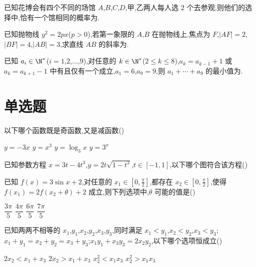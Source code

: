 \begin{problem}
已知花博会有四个不同的场馆 \(A\),\(B\),\(C\),\(D\),甲,乙两人每人选 \(2\) 个去参观,则他们的选择中,恰有一个馆相同的概率为\fillinblank{}.
\end{problem}

\begin{problem}
已知抛物线 \(y^2=2px\)(\(p>0\)),若第一象限的 \(A\),\(B\) 在抛物线上,焦点为 \(F\),\(|AF|=2\),\(|BF|=4\),\(|AB|=3\),求直线 \(AB\) 的斜率为\fillinblank{}.
\end{problem}

\begin{problem}
已知 \(a_i\in \N^*\)(\(i=1\),\(2\),\(\dots\),\(9\)),对任意的 \(k\in \N^*\)(\(2\le k\le 8\)),\(a_k=a_{k-1}+1\) 或 \(a_k=a_{k+1}-1\) 中有且仅有一个成立,\(a_1=6\),\(a_9=9\),则 \(a_1+\cdots+a_9\) 的最小值为\fillinblank{}.
\end{problem}

\section{单选题}

\begin{problem}
以下哪个函数既是奇函数,又是减函数(\quad)

\choices
    {\(y=-3x\)}
    {\(y=x^3\)}
    {\(y=\log_3 x\)}
    {\(y=3^x\)}
\end{problem}

\begin{problem}
已知参数方程 \(x=3t-4t^3\),\(y=2t\sqrt{1-t^2}\),\(t\in[-1,1]\),以下哪个图符合该方程(\quad)

\choices
    {}
    {}
    {}
    {}
\end{problem}

\begin{problem}
已知 \(f(x)=3\sin x+2\),对任意的 \(x_1\in\left[ 0,\frac{\pi}{2} \right]\),都存在 \(x_2\in\left[ 0,\frac{\pi}{2} \right]\),使得 \(f(x_1)=2f(x_2+\theta)+2\) 成立,则下列选项中,\(\theta\) 可能的值是(\quad)

\choices
    {\(\dfrac{3\pi}{5}\)}
    {\(\dfrac{4\pi}{5}\)}
    {\(\dfrac{6\pi}{5}\)}
    {\(\dfrac{7\pi}{5}\)}
\end{problem}

\begin{problem}
已知两两不相等的 \(x_1\),\(y_1\),\(x_2\),\(y_2\),\(x_3\),\(y_3\),同时满足 \(x_1<y_1\),\(x_2<y_2\),\(x_3<y_3\);\(x_1+y_1=x_2+y_2=x_3+y_3\);\(x_1y_1+x_3y_3=2x_2y_2\),以下哪个选项恒成立(\quad)

\choices
    {\(2x_2<x_1+x_3\)}
    {\(2x_2>x_1+x_3\)}
    {\(x_2^2<x_1x_3\)}
    {\(x_2^2>x_1x_3\)}
\end{problem}


